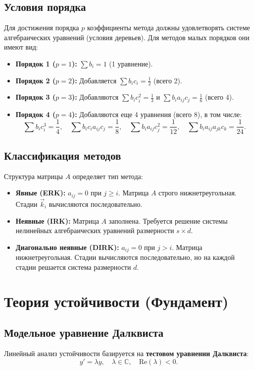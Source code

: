 \documentclass[12pt,a4paper]{article}
\begin{document}
\subsection{Условия порядка}
Для достижения порядка $p$ коэффициенты метода должны удовлетворять системе алгебраических уравнений (условия деревьев). Для методов малых порядков они имеют вид:
\begin{itemize}
    \item \textbf{Порядок 1 ($p=1$):} $\sum b_i = 1$ (1 уравнение).
    \item \textbf{Порядок 2 ($p=2$):} Добавляется $\sum b_i c_i = \frac{1}{2}$ (всего 2).
    \item \textbf{Порядок 3 ($p=3$):} Добавляются $\sum b_i c_i^2 = \frac{1}{3}$ и $\sum b_i a_{ij} c_j = \frac{1}{6}$ (всего 4).
    \item \textbf{Порядок 4 ($p=4$):} Добавляются еще 4 уравнения (всего 8), в том числе:
    \[
        \sum b_i c_i^3 = \frac{1}{4}, \quad \sum b_i c_i a_{ij} c_j = \frac{1}{8}, \quad \sum b_i a_{ij} c_j^2 = \frac{1}{12}, \quad \sum b_i a_{ij} a_{jk} c_k = \frac{1}{24}.
    \]
\end{itemize}

\subsection{Классификация методов}
Структура матрицы $A$ определяет тип метода:
\begin{itemize}
    \item \textbf{Явные (ERK):} $a_{ij} = 0$ при $j \ge i$. Матрица $A$ строго нижнетреугольная. Стадии $\vec{k}_i$ вычисляются последовательно.
    \item \textbf{Неявные (IRK):} Матрица $A$ заполнена. Требуется решение системы нелинейных алгебраических уравнений размерности $s \times d$.
    \item \textbf{Диагонально неявные (DIRK):} $a_{ij} = 0$ при $j > i$. Матрица нижнетреугольная. Стадии вычисляются последовательно, но на каждой стадии решается система размерности $d$.
\end{itemize}

\section{Теория устойчивости (Фундамент)}

\subsection{Модельное уравнение Далквиста}
Линейный анализ устойчивости базируется на \textbf{тестовом уравнении Далквиста}:
\begin{equation}
    y' = \lambda y, \quad \lambda \in \mathbb{C}, \quad \text{Re}(\lambda) < 0.
\end{equation}
\end{document}
